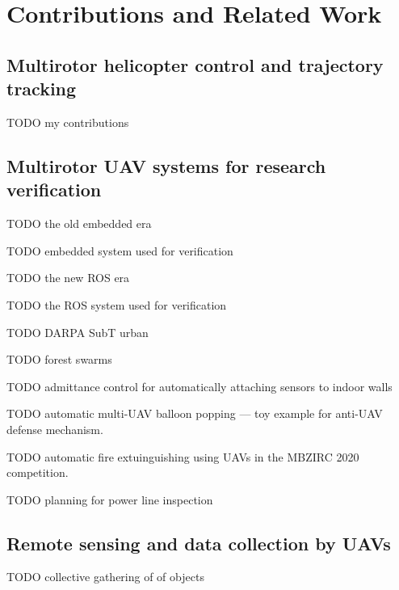 \documentclass[a4paper,11pt,titlepage,twoside]{book}
\newcommand{\todo}[1]{{\color{red} TODO {#1}}}
\newcommand{\chapternoclear}[1]{
  \begingroup
  \let\cleardoublepage\clearpage
  \chapter{#1}
  \endgroup
}
\begin{document}
\chapternoclear{Contributions and Related Work}

\section{Multirotor helicopter control and trajectory tracking}

\todo{my contributions}
\cite{baca2016embedded} %
\cite{baca2018model} %
\cite{baca2020mrs} %

\section{Multirotor UAV systems for research verification}

\todo{the old embedded era}
\cite{baca2016embedded} %
\cite{saska2017system} %

\todo{embedded system used for verification}
\cite{spurny2016complex} %
\cite{chudoba2016exploration} %
\cite{saska2016formations} %

\todo{the new ROS era}
\cite{baca2018model}
\cite{baca2020mrs}

\todo{the ROS system used for verification}
\cite{saska2017documentation}
\cite{faigl2017onsolution}
\cite{giernacki2019realtime}
\cite{petracek2020bioinspired}
\cite{saska2020formation}
\cite{saikin2020wildfire}


\todo{DARPA SubT urban}
\cite{kratky2020autonomous2} %

\todo{forest swarms}
\cite{dmytruk2020safe}
\cite{ahmad2020autonomous}

\todo{admittance control for automatically attaching sensors to indoor walls}
\cite{smrcka2020admittance}

\todo{automatic multi-UAV balloon popping --- toy example for anti-UAV defense mechanism.}
\cite{stasinchuk2020multiuav}

\todo{automatic fire extuinguishing using UAVs in the MBZIRC 2020 competition.}
\cite{walter2020extinguishing}

\todo{planning for power line inspection}
\cite{silano2020power}

\section{Remote sensing and data collection by UAVs}

\todo{collective gathering of of objects}
\cite{spurny2019cooperative}
\cite{loianno2018localization}
\end{document}
